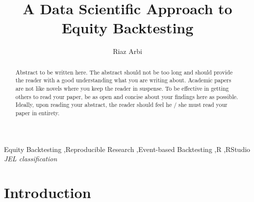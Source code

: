 \documentclass[11pt,preprint, authoryear]{elsarticle}
\numberwithin{equation}{section}
\numberwithin{figure}{section}
\numberwithin{table}{section}
\begin{document}
\begin{frontmatter}  %

\title{A Data Scientific Approach to Equity Backtesting}





\author[Add1]{Riaz Arbi}
\ead{}





\address[Add1]{University of Cape Town, South Africa}


\begin{abstract}
\small{
Abstract to be written here. The abstract should not be too long and
should provide the reader with a good understanding what you are writing
about. Academic papers are not like novels where you keep the reader in
suspense. To be effective in getting others to read your paper, be as
open and concise about your findings here as possible. Ideally, upon
reading your abstract, the reader should feel he / she must read your
paper in entirety.
}
\end{abstract}

\vspace{1cm}

\begin{keyword}
\footnotesize{
Equity Backtesting \sep Reproducible Research \sep Event-based
Backtesting \sep R \sep RStudio \\ \vspace{0.3cm}
\textit{JEL classification} 
}
\end{keyword}
\vspace{0.5cm}
\end{frontmatter}


\renewcommand{\contentsname}{Table of Contents}
{\tableofcontents}

\pagestyle{fancy}
\chead{}
\rhead{}
\lfoot{}
\lhead{}
\cfoot{}


\headsep 35pt %




\pagebreak

\section{\texorpdfstring{Introduction
\label{Introduction}}{Introduction }}\label{introduction}
\end{document}
